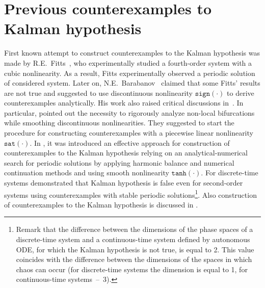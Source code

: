 \documentclass{ifacconf}
\theoremstyle{plain}
\begin{document}
\section{Previous counterexamples to Kalman hypothesis}
First known attempt to construct counterexamples to the Kalman hypothesis
was made by R.E.~Fitts~\citep{Fitts-1966},
who experimentally studied a fourth-order system
with a cubic nonlinearity.
As a result, Fitts experimentally observed a periodic solution of considered system.
Later on, N.E.~Barabanov~\citep{Barabanov-1988} claimed that some Fitts' results
are not true and suggested to use discontinuous nonlinearity $\texttt{sign}(\cdot)$
to derive counterexamples analytically.
His work also raised critical discussions
in~\citep{BernatL-1996,Meisters-1996,UMN-1998}.
In particular, \cite{BernatL-1996} pointed out the necessity to rigorously analyze
non-local bifurcations while smoothing discontinuous nonlinearities.
They suggested
to start the procedure for constructing counterexamples
with a piecewise linear nonlinearity $\texttt{sat}(\cdot)$.
In \citep{BraginKL-2010-IFAC,BraginVKL-2011,LeonovK-2011-DAN},
it was introduced an effective approach for
construction of counterexamples to the Kalman hypothesis relying on
an analytical-numerical search for periodic solutions by applying harmonic balance and
numerical continuation methods and using smooth nonlinearity $\texttt{tanh}(\cdot)$.
For discrete-time systems \cite{HeathCS-2015} demonstrated that Kalman hypothesis
is false even for second-order systems using counterexamples
with stable periodic solutions\footnote{
    Remark that the difference between the dimensions of the phase spaces of a discrete-time system
    and a continuous-time system defined by autonomous ODE,
    for which the Kalman hypothesis is not true, is equal to 2.
    This value coincides with the difference between the dimensions of the spaces
    in which chaos can occur (for discrete-time systems the dimension is equal to 1,
    for continuous-time systems~--~3).
}.
Also construction of counterexamples to the Kalman hypothesis
is discussed in \citep{BurkinK-2014-HA}.
\end{document}
